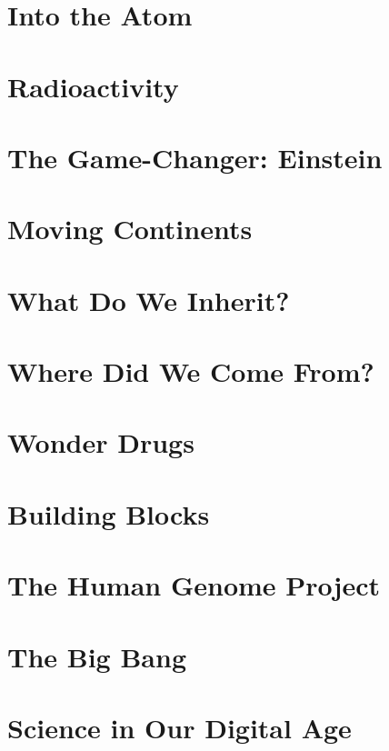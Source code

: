 \documentclass[a4paper,11pt]{article}
\begin{document}
\section{Into the Atom}

\section{Radioactivity}

\section{The Game-Changer: Einstein}

\section{Moving Continents}

\section{What Do We Inherit?}

\section{Where Did We Come From?}

\section{Wonder Drugs}

\section{Building Blocks}

\section{The Human Genome Project}

\section{The Big Bang}

\section{Science in Our Digital Age }
\end{document}
